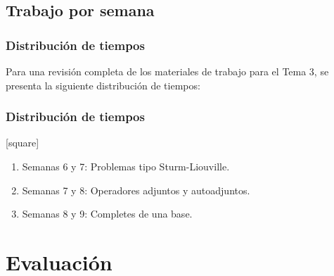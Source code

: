 \documentclass[12pt]{beamer}
\begin{document}
\subsection{Trabajo por semana}

\begin{frame}
\frametitle{Distribución de tiempos}
Para una revisión completa de los materiales de trabajo para el Tema 3, se presenta la siguiente distribución de tiempos:
\end{frame}
\begin{frame}
\frametitle{Distribución de tiempos}
[square]
\begin{enumerate}
\item Semanas 6 y 7: Problemas tipo Sturm-Liouville.
\item Semanas 7 y 8: Operadores adjuntos y autoadjuntos.
\item Semanas 8 y 9: Completes de una base.
\end{enumerate}
\end{frame}



\section{Evaluación}
\end{document}
